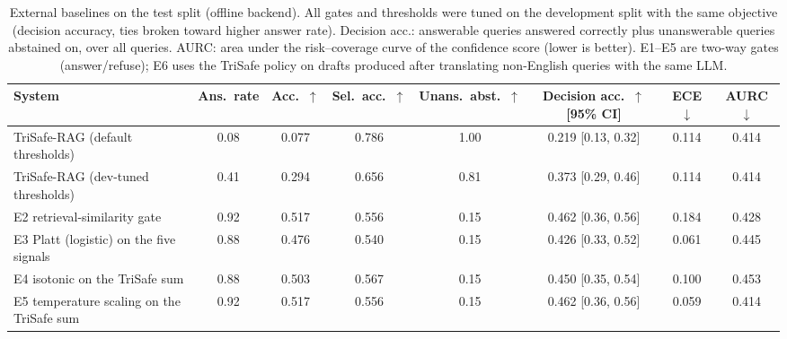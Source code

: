 \begin{table}[t]
  \caption{External baselines on the test split (offline backend). All gates and thresholds were tuned on the development split with the same objective (decision accuracy, ties broken toward higher answer rate). Decision acc.: answerable queries answered correctly plus unanswerable queries abstained on, over all queries. AURC: area under the risk--coverage curve of the confidence score (lower is better). E1--E5 are two-way gates (answer/refuse); E6 uses the TriSafe policy on drafts produced after translating non-English queries with the same LLM.}
  \label{tab:external-offline}
  \footnotesize
  \setlength{\tabcolsep}{4pt}
  \begin{tabular}{lccccccc}
    \toprule
    System & Ans.\ rate & Acc.\ $\uparrow$ & Sel.\ acc.\ $\uparrow$ & Unans.\ abst.\ $\uparrow$ & Decision acc.\ $\uparrow$ [95\% CI] & ECE $\downarrow$ & AURC $\downarrow$ \\
    \midrule
    TriSafe-RAG (default thresholds) & 0.08 & 0.077 & 0.786 & 1.00 & 0.219 [0.13, 0.32] & 0.114 & 0.414 \\
    TriSafe-RAG (dev-tuned thresholds) & 0.41 & 0.294 & 0.656 & 0.81 & 0.373 [0.29, 0.46] & 0.114 & 0.414 \\
    E2 retrieval-similarity gate & 0.92 & 0.517 & 0.556 & 0.15 & 0.462 [0.36, 0.56] & 0.184 & 0.428 \\
    E3 Platt (logistic) on the five signals & 0.88 & 0.476 & 0.540 & 0.15 & 0.426 [0.33, 0.52] & 0.061 & 0.445 \\
    E4 isotonic on the TriSafe sum & 0.88 & 0.503 & 0.567 & 0.15 & 0.450 [0.35, 0.54] & 0.100 & 0.453 \\
    E5 temperature scaling on the TriSafe sum & 0.92 & 0.517 & 0.556 & 0.15 & 0.462 [0.36, 0.56] & 0.059 & 0.414 \\
    \bottomrule
  \end{tabular}
\end{table}
